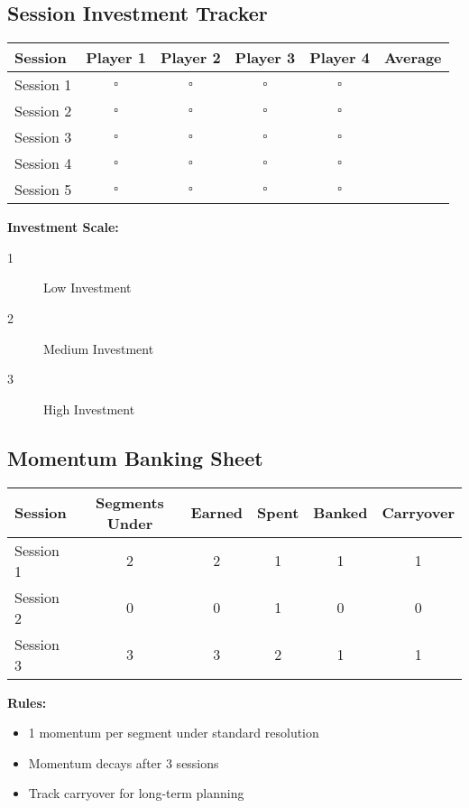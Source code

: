 \subsection{Session Investment Tracker}
\begin{center}
\begin{tabular}{|l|c|c|c|c|c|}
\hline
\textbf{Session} & \textbf{Player 1} & \textbf{Player 2} & \textbf{Player 3} & \textbf{Player 4} & \textbf{Average} \\
\hline
Session 1 & $\square$ & $\square$ & $\square$ & $\square$ & \\
Session 2 & $\square$ & $\square$ & $\square$ & $\square$ & \\
Session 3 & $\square$ & $\square$ & $\square$ & $\square$ & \\
Session 4 & $\square$ & $\square$ & $\square$ & $\square$ & \\
Session 5 & $\square$ & $\square$ & $\square$ & $\square$ & \\
\hline
\end{tabular}
\end{center}

\textbf{Investment Scale:}
\begin{description}
\item[1] Low Investment
\item[2] Medium Investment  
\item[3] High Investment
\end{description}

\subsection{Momentum Banking Sheet}
\begin{center}
\begin{tabular}{|l|c|c|c|c|c|}
\hline
\textbf{Session} & \textbf{Segments Under} & \textbf{Earned} & \textbf{Spent} & \textbf{Banked} & \textbf{Carryover} \\
\hline
Session 1 & 2 & 2 & 1 & 1 & 1 \\
Session 2 & 0 & 0 & 1 & 0 & 0 \\
Session 3 & 3 & 3 & 2 & 1 & 1 \\
\hline
\end{tabular}
\end{center}

\textbf{Rules:}
\begin{itemize}
\item 1 momentum per segment under standard resolution
\item Momentum decays after 3 sessions
\item Track carryover for long-term planning
\end{itemize}

